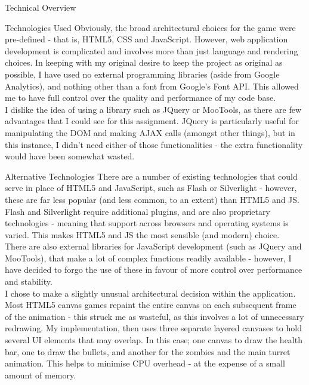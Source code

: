 \documentclass[11pt]{article}
\begin{document}
\begin{section}{Technical Overview}
    \begin{subsection}{Technologies Used}
    		Obviously, the broad architectural choices for the game were pre-defined - that is, HTML5, CSS and JavaScript. However, web application development is complicated and involves more than just language and rendering choices. In keeping with my original desire to keep the project as original as possible, I have used no external programming libraries (aside from Google Analytics\cite{GAnalytics}), and nothing other than a font from Google's Font API\cite{GFonts}. This allowed me to have full control over the quality and performance of my code base. \\
    		
    		I dislike the idea of using a library such as JQuery or MooTools, as there are few advantages that I could see for this assignment. JQuery is particularly useful for manipulating the DOM and making AJAX calls (amongst other things), but in this instance, I didn't need either of those functionalities - the extra functionality would have been somewhat wasted.
    \end{subsection}
    
    \clearpage
    \begin{subsection}{Alternative Technologies}
    		There are a number of existing technologies that could serve in place of HTML5 and JavaScript, such as Flash or Silverlight - however, these are far less popular (and less common, to an extent) than HTML5 and JS. Flash and Silverlight require additional plugins, and are also proprietary technologies - meaning that support across browsers and operating systems is varied. This makes HTML5 and JS the most sensible (and modern) choice. \\
    		
    		There are also external libraries for JavaScript development (such as JQuery and MooTools), that make a lot of complex functions readily available - however, I have decided to forgo the use of these in favour of more control over performance and stability. \\
    		
    		I chose to make a slightly unusual architectural decision within the application. Most HTML5 canvas games repaint the entire canvas on each subsequent frame of the animation - this struck me as wasteful, as this involves a lot of unnecessary redrawing. My implementation, then uses three separate layered canvases to hold several UI elements that may overlap. In this case; one canvas to draw the health bar, one to draw the bullets, and another for the zombies and the main turret animation. This helps to minimise CPU overhead - at the expense of a small amount of memory.
    \end{subsection}
\end{section}
    
\end{document}
